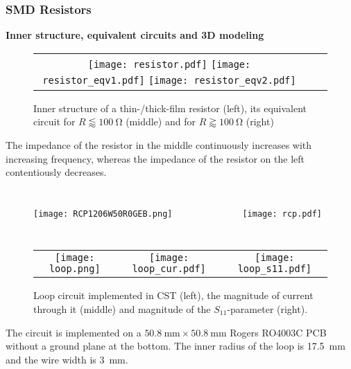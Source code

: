 \begin{frame}
	\frametitle{SMD Resistors} \textbf{Inner structure, equivalent circuits and 3D modeling}\\
	\begin{figure}
		\centering
		\begin{tabular}{ccc}
			\texttt{[image: resistor.pdf]}
			\hspace{25pt}
			\texttt{[image: resistor\_eqv1.pdf]}
			\hspace{25pt}
			\texttt{[image: resistor\_eqv2.pdf]}
		\end{tabular}
		\caption{Inner structure of a thin-/thick-film resistor (left), its equivalent circuit for $R \lessapprox \SI{100}{\ohm}$ (middle) and for  $R \gtrapprox \SI{100}{\ohm}$ (right) \cite{hft}}
	\end{figure}
	\vspace{-25pt}
	The impedance of the resistor in the middle continuously increases with increasing frequency, whereas the impedance of the resistor on the left contentiously decreases.
	\vspace{-20pt}
	\begin{columns}
		\begin{figure}
			\texttt{[image: RCP1206W50R0GEB.png]}
		\end{figure}
		\begin{figure}
			\texttt{[image: rcp.pdf]}
		\end{figure}
		\vspace{3em}
	\end{columns}
\end{frame}

\begin{frame}
	\begin{figure}
		\centering
		\begin{tabular}{ccc}
			\texttt{[image: loop.png]}&
			\hspace{25pt}
			\texttt{[image: loop\_cur.pdf]}&
			\hspace{25pt}
			\texttt{[image: loop\_s11.pdf]}
		\end{tabular}
		\caption{Loop circuit implemented in CST (left), the magnitude of current through it (middle) and magnitude of the $S_{11}$-parameter (right).}
	\end{figure}
	The circuit is implemented on a $\SI{50.8}{\milli\meter} \times \SI{50.8}{\milli\meter}$ Rogers RO4003C PCB without a ground plane at the bottom. The inner radius of the loop is \SI{17.5}{\milli\meter} and the wire width is \SI{3}{\milli\meter}.
\end{frame}

